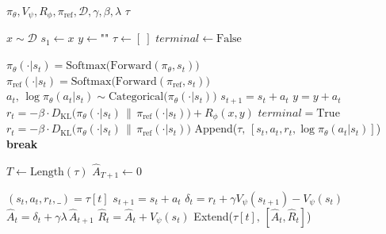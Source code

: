 \documentclass{article}
\begin{document}
\begin{algorithm}
\caption*{\textbf{Algorithm:} Trajectory Sampling (Step-wise)}
\begin{algorithmic}[1]
\Require $\pi_{\theta}, V_{\psi}, R_{\phi}, \pi_{\text{ref}}, \mathcal{D}, \gamma, \beta, \lambda$
\Ensure $\tau$

\State $x \sim \mathcal{D}$ 
\State $s_1 \gets x$ 
\State $y \gets \text{""}$ 
\State $\tau \gets [\ ]$ 
\State $terminal \gets \text{False}$ 

    \State $\pi_\theta(\cdot|s_t) = \text{Softmax}\big(\text{Forward}(\pi_{\theta}, s_t)\big)$
    \State $\pi_\text{ref}(\cdot|s_t) = \text{Softmax}\big(\text{Forward}(\pi_{\text{ref}}, s_t)\big)$
    \State $a_t,\, \log\pi_{\theta}(a_t|s_t) \sim \text{Categorical}\big(\pi_\theta(\cdot|s_t)\big)$ 
    \State $s_{t+1} = s_t + a_t$
    \State $y = y + a_t$
     
        \State $r_t = -\beta{\cdot}D_{\text{KL}}\big(\pi_\theta(\cdot|s_t) \,\|\, \pi_\text{ref}(\cdot|s_t)\big) + R_\phi(x,y)$
        \State $terminal = \text{True}$
    \Else
        \State $r_t = -\beta{\cdot}D_{\text{KL}}\big(\pi_\theta(\cdot|s_t) \,\|\, \pi_\text{ref}(\cdot|s_t)\big)$
    \EndIf
    \State Append\big($\tau,\, [s_t, a_t, r_t, \log\pi_{\theta}(a_t|s_t)]$\big) 
        \State \textbf{break}
    \EndIf
\EndFor

\State $T \gets \text{Length}(\tau)$
\State $\hat{A}_{T+1} \gets 0$ 

    \State $(s_t, a_t, r_t, \_) = \tau[t]$
    \State $s_{t+1} = s_t + a_t$
    \State $\delta_t = r_t + \gamma V_{\psi}(s_{t+1}) - V_{\psi}(s_t)$
    \State $\hat{A}_t = \delta_t + \gamma\lambda\,\hat{A}_{t+1}$ 
    \State $\hat{R}_t = \hat{A}_t + V_{\psi}(s_t)$ 
    \State Extend\big($\tau[t],\, [\hat{A}_t, \hat{R}_t]$\big) 
\EndFor

\end{algorithmic}
\end{algorithm}
\end{document}
